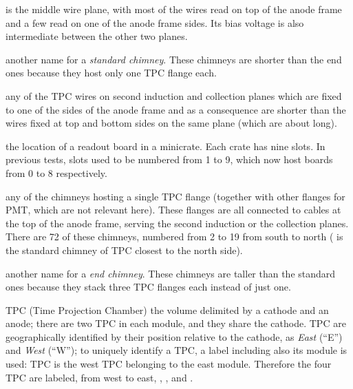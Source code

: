 \begin{description}
  \item[Second induction plane]
    is the middle wire plane,
    with most of the wires read on top of the anode frame and a few read on one
    of the anode frame sides.
    Its bias voltage is also intermediate between the other two planes.

  \item[Short chimney]
    another name for a \emph{standard chimney}. These chimneys are shorter
    than the end ones because they host only one TPC flange each.

  \item[Short wire]
    any of the TPC wires on second induction and collection planes which are
    fixed to one of the sides of the anode frame and as a consequence are
    shorter than the wires fixed at top and bottom sides on the same plane
    (which are about  long).

  \item[Slot]
    the location of a readout board in a minicrate. Each crate has nine slots.
    In previous tests, slots used to be numbered from 1 to 9, which now host
    boards from 0 to 8 respectively.

  \item[Standard chimney]
    any of the chimneys hosting a single TPC flange (together with other flanges
    for PMT, which are not relevant here). These flanges are all connected to
    cables at the top of the anode frame, serving the second induction or the
    collection planes. There are 72 of these chimneys,
    numbered from 2 to 19 from south to north (\eg {} is the
    standard chimney of TPC  closest to the north side).

  \item[Tall chimney]
    another name for a \emph{end chimney}. These chimneys are taller than the
    standard ones because they stack three TPC flanges each instead of just one.

  \item{TPC}
    (Time Projection Chamber) the volume delimited by a cathode and an
    anode; there are two TPC in each module, and they share the cathode.
    TPC are geographically identified by their position relative to the cathode,
    as \emph{East} (``E'') and \emph{West} (``W''); to uniquely identify a TPC,
    a label including also its module is used: TPC  is the west TPC
    belonging to the east module. Therefore the four TPC are labeled, from west
    to east, , ,  and .


\end{description}
